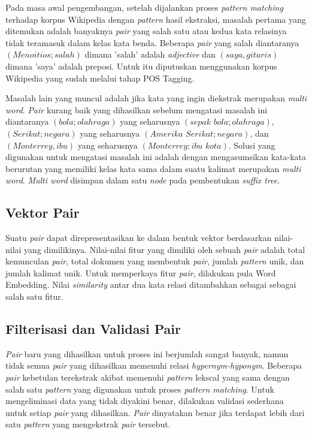 Pada masa awal pengembangan, setelah dijalankan proses \textit{pattern matching} terhadap korpus Wikipedia dengan \textit{pattern} hasil ekstraksi, masalah pertama yang ditemukan adalah banyaknya \textit{pair} yang salah satu atau kedua kata relasinya tidak teramasuk dalam kelas kata benda. Beberapa \textit{pair} yang salah diantaranya $(Menoitios;salah)$ dimana 'salah' adalah \textit{adjective} dan $(saya,gitaris)$ dimana 'saya' adalah preposi. Untuk itu diputuskan menggunakan korpus Wikipedia yang sudah melalui tahap POS Tagging.

Masalah lain yang muncul adalah jika kata yang ingin diekstrak merupakan \textit{multi word}. \textit{Pair} kurang baik yang dihasilkan sebelum mengatasi masalah ini diantaranya $(bola;olahraga)$ yang seharusnya $(sepak\,\,bola;olahraga)$, $(Serikat;negara)$ yang seharusnya $(Amerika\,\,Serikat;negara)$, dan $(Monterrey,ibu)$ yang seharusnya $(Monterrey;ibu\,\,kota)$. Solusi yang digunakan untuk mengatasi masalah ini adalah dengan mengasumsikan kata-kata berurutan yang memiliki kelas kata sama dalam suatu kalimat merupakan \textit{multi word}. \textit{Multi word} disimpan dalam satu \textit{node} pada pembentukan \textit{suffix tree}.

\subsection{Vektor Pair}
Suatu \textit{pair} dapat direpresentasikan ke dalam bentuk vektor berdasarkan nilai-nilai yang dimilikinya. Nilai-nilai fitur yang dimiliki oleh sebuah \textit{pair} adalah total kemunculan \textit{pair}, total dokumen yang membentuk \textit{pair}, jumlah \textit{pattern} unik, dan jumlah kalimat unik. Untuk memperkaya fitur \textit{pair}, dilakukan pula Word Embedding. Nilai \textit{similarity} antar dua kata relasi ditambahkan sebagai sebagai salah satu fitur.

\subsection{Filterisasi dan Validasi Pair}
\textit{Pair} baru yang dihasilkan untuk proses ini berjumlah sangat banyak, namun tidak semua \textit{pair} yang dihasilkan memenuhi relasi \textit{hypernym-hyponym}. Beberapa \textit{pair} kebetulan terekstrak akibat memenuhi \textit{pattern} lekscal yang sama dengan salah satu \textit{pattern} yang digunakan untuk proses \textit{pattern matching}. Untuk mengeliminasi data yang tidak diyakini benar, dilakukan validasi sederhana untuk setiap \textit{pair} yang dihasilkan. \textit{Pair} dinyatakan benar jika terdapat lebih dari satu \textit{pattern} yang mengekstrak \textit{pair} tersebut.


